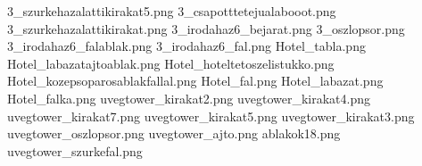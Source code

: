 3_szurkehazalattikirakat5.png
3_csapotttetejualabooot.png
3_szurkehazalattikirakat.png
3_irodahaz6_bejarat.png
3_oszlopsor.png
3_irodahaz6_falablak.png
3_irodahaz6_fal.png
Hotel_tabla.png
Hotel_labazatajtoablak.png
Hotel_hoteltetoszelistukko.png
Hotel_kozepsoparosablakfallal.png
Hotel_fal.png
Hotel_labazat.png
Hotel_falka.png
uvegtower_kirakat2.png
uvegtower_kirakat4.png
uvegtower_kirakat7.png
uvegtower_kirakat5.png
uvegtower_kirakat3.png
uvegtower_oszlopsor.png
uvegtower_ajto.png
ablakok18.png
uvegtower_szurkefal.png
